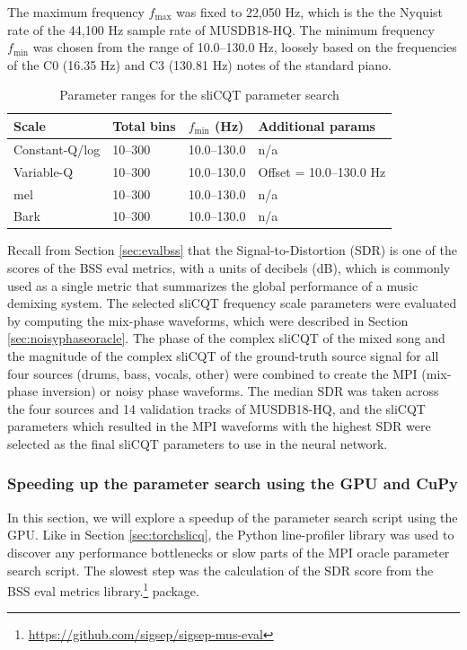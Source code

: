\documentclass[report.tex]{subfiles}
\begin{document}
The maximum frequency $f_{\text{max}}$ was fixed to 22,050 Hz, which is the the Nyquist rate of the 44,100 Hz sample rate of MUSDB18-HQ. The minimum frequency $f_{\text{min}}$ was chosen from the range of 10.0--130.0 Hz, loosely based on the frequencies of the C0 (16.35 Hz) and C3 (130.81 Hz) notes of the standard piano.

\begin{table}[ht]
	\centering
	\caption{Parameter ranges for the sliCQT parameter search}
	\label{table:slicqparams}
\begin{tabular}{ |l|l|l|l| }
	 \hline
	 Scale & Total bins & $f_{\text{min}}$ (Hz) & Additional params \\
	 \hline
	 \hline
	 Constant-Q/log & 10--300 & 10.0--130.0 & n/a \\
	 \hline
	 Variable-Q & 10--300 & 10.0--130.0 & Offset = 10.0--130.0 Hz \\
	 \hline
	 mel & 10--300 & 10.0--130.0 & n/a \\
	 \hline
	 Bark & 10--300 & 10.0--130.0 & n/a \\
	 \hline
\end{tabular}
\end{table}

Recall from Section \ref{sec:evalbss} that the Signal-to-Distortion (SDR) is one of the scores of the BSS eval metrics, with a units of decibels (dB), which is commonly used as a single metric that summarizes the global performance of a music demixing system. The selected sliCQT frequency scale parameters were evaluated by computing the mix-phase waveforms, which were described in Section \ref{sec:noisyphaseoracle}. The phase of the complex sliCQT of the mixed song and the magnitude of the complex sliCQT of the ground-truth source signal for all four sources (drums, bass, vocals, other) were combined to create the MPI (mix-phase inversion) or noisy phase waveforms. The median SDR was taken across the four sources and 14 validation tracks of MUSDB18-HQ, and the sliCQT parameters which resulted in the MPI waveforms with the highest SDR were selected as the final sliCQT parameters to use in the neural network.

\subsubsection{Speeding up the parameter search using the GPU and CuPy}
\label{sec:fasterbsscupy}

In this section, we will explore a speedup of the parameter search script using the GPU. Like in Section \ref{sec:torchslicq}, the Python line-profiler library was used to discover any performance bottlenecks or slow parts of the MPI oracle parameter search script. The slowest step was the calculation of the SDR score from the BSS eval metrics library.\footnote{\url{https://github.com/sigsep/sigsep-mus-eval}} package.
\end{document}
